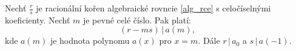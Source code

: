 \begin{veta}
    Nechť $\frac{r}{s}$ je racionální kořen algebraické rovncie \ref{alg_rce} s celočíselnými koeficienty.
    Nechť $m$ je pevné celé číslo. Pak platí:
    $$(r-ms) \, |\, a(m),$$
    kde $a(m)$ je hodnota polynomu $a(x)$ pro $x=m.$ Dále $r \, | \, a_0$ a $s\, |\, a(-1).$
\end{veta}

\begin{comment}
\begin{veta}[Hledání racionálních kořenů polynomu s racionálními koeficienty]
  Mějme polynom $P(x) \in \mathbb Q [x]$. Potom najdeme jeho kořeny $\frac{r}{s} \in \mathbb Q$ takto:
  \begin{enumerate}[1.]
    \item Nalezneme všechny celočíselné dělitele $r$ absolutního členu polynomu $a_0$.
    \item Nalezneme všechny přirozené dělitele $s$ vedoucího členu $a_n$.
    \item Utvoříme všechny zlomky tvaru $\frac{r}{s}, (r,s) = 1$.
    \item Hornerovým schématem určíme $P(1)$, případně $P(-1)$ ($1$ a $-1$ také mohou být kořeny).
    \item Vyškrtáme ty zlomky $\frac{r}{s}$, které nesplňují podmínky $(r-s) \mid P(1) \land (r+s) \mid P(-1)$.
    \item U ostatních zlomků vyzkoušíme Hornerovým schématem, zda jsou kořeny daného polynomu.
  \end{enumerate}
\end{veta}
\end{comment}


